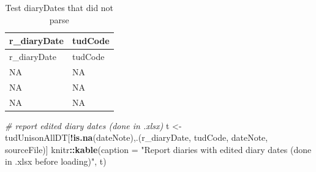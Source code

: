 \documentclass[]{article}
\newenvironment{Shaded}{\begin{snugshade}}{\end{snugshade}}
\newcommand{\KeywordTok}[1]{\textcolor[rgb]{0.13,0.29,0.53}{\textbf{#1}}}
\newcommand{\DataTypeTok}[1]{\textcolor[rgb]{0.13,0.29,0.53}{#1}}
\newcommand{\StringTok}[1]{\textcolor[rgb]{0.31,0.60,0.02}{#1}}
\newcommand{\CommentTok}[1]{\textcolor[rgb]{0.56,0.35,0.01}{\textit{#1}}}
\newcommand{\OperatorTok}[1]{\textcolor[rgb]{0.81,0.36,0.00}{\textbf{#1}}}
\newcommand{\NormalTok}[1]{#1}
\begin{document}
\begin{longtable}[]{@{}ll@{}}
\caption{Test diaryDates that did not parse}\tabularnewline
\toprule
r\_diaryDate & tudCode\tabularnewline
\midrule
\endfirsthead
\toprule
r\_diaryDate & tudCode\tabularnewline
\midrule
\endhead
NA & NA\tabularnewline
NA & NA\tabularnewline
NA & NA\tabularnewline
\bottomrule
\end{longtable}

\begin{Shaded}
\begin{Highlighting}[]
\CommentTok{# report edited diary dates (done in .xlsx)}
\NormalTok{t <-}\StringTok{ }\NormalTok{tudUnisonAllDT[}\OperatorTok{!}\KeywordTok{is.na}\NormalTok{(dateNote),.(r_diaryDate, tudCode, dateNote, sourceFile)]}
\NormalTok{knitr}\OperatorTok{::}\KeywordTok{kable}\NormalTok{(}\DataTypeTok{caption =} \StringTok{"Report diaries with edited diary dates (done in .xlsx before loading)"}\NormalTok{, t)}
\end{Highlighting}
\end{Shaded}
\end{document}
